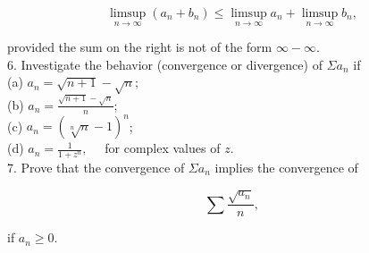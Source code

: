 \documentclass[10pt]{article}
\begin{document}
$$
\limsup _{n \rightarrow \infty}\left(a_{n}+b_{n}\right) \leq \limsup _{n \rightarrow \infty} a_{n}+\limsup _{n \rightarrow \infty} b_{n},
$$

provided the sum on the right is not of the form $\infty-\infty$.\\
6. Investigate the behavior (convergence or divergence) of $\Sigma a_{n}$ if\\
(a) $a_{n}=\sqrt{n+1}-\sqrt{n}$;\\
(b) $a_{n}=\frac{\sqrt{n+1}-\sqrt{n}}{n}$;\\
(c) $a_{n}=(\sqrt[n]{n}-1)^{n}$;\\
(d) $a_{n}=\frac{1}{1+z^{n}}, \quad$ for complex values of $z$.\\
7. Prove that the convergence of $\Sigma a_{n}$ implies the convergence of

$$
\sum \frac{\sqrt{a_{n}}}{n},
$$

if $a_{n} \geq 0$.
\end{document}
